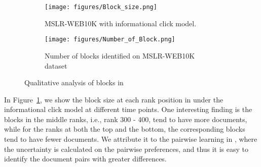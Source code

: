 \begin{figure}[t]
    \centering
    \begin{subfigure}[b]{0.23\textwidth}
    \texttt{[image: figures/Block\_size.png]}
    \caption{MSLR-WEB10K with informational click model.}
    \label{fig:block_size_inf}
    \end{subfigure}
    \begin{subfigure}[b]{0.23\textwidth}
    \texttt{[image: figures/Number\_of\_Block.png]}
    \caption{Number of blocks identified on MSLR-WEB10K dataset}
    \label{fig:number_of_block}
    \end{subfigure}
    \caption{Qualitative analysis of blocks in \model{}}
    \label{fig:block_analysis}
\end{figure}

In Figure~\ref{fig:block_size_inf}, we show the block size at each rank position in \model{} under the informational click model at different time points. One interesting finding is the blocks in the middle ranks, i.e., rank 300 - 400, tend to have more documents, while for the ranks at both the top and the bottom, the corresponding blocks tend to have fewer documents. We attribute it to the pairwise learning in \model{}, where the uncertainty is calculated on the pairwise preferences, and thus it is easy to identify the document pairs with greater differences.





